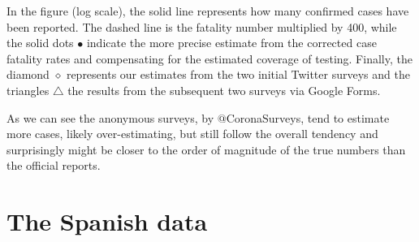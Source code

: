 \documentclass{article}
\begin{document}
In the figure (log scale), the solid line represents how many confirmed cases have been reported. The dashed line is the fatality number multiplied by 400, while the solid dots $\bullet$ indicate the more precise estimate from the corrected case fatality rates and compensating for the estimated coverage of testing. Finally, the diamond $\diamond$ represents our estimates from the two initial Twitter surveys and the triangles $\triangle$ the results from the subsequent two surveys via Google Forms. 

As we can see the anonymous surveys, by $@$CoronaSurveys, tend to estimate more cases, likely over-estimating, but still follow the overall tendency and surprisingly might be closer to the order of magnitude of the true numbers than the official reports. 

\section{The Spanish data}
\end{document}

